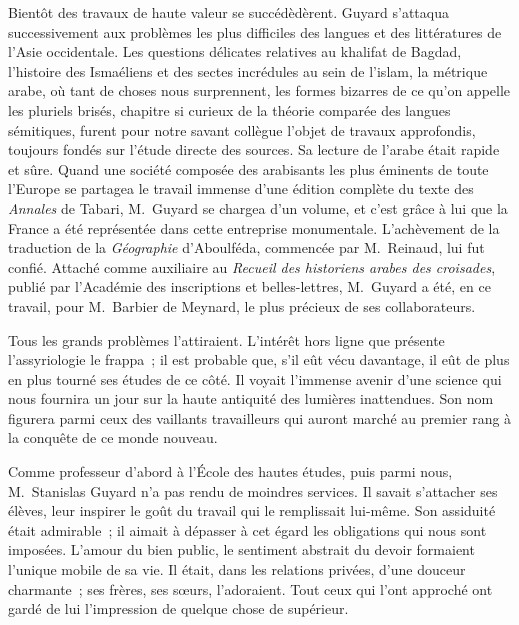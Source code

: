 \documentclass[french,twoside]{book} %
\newcommand\orgName[1]{#1}
\newcommand\persName[1]{#1}
\newcommand\placeName[1]{#1}
\begin{document}
Bientôt des travaux de haute valeur se succédèdèrent. {\persName Guyard} s’attaqua successivement aux problèmes les plus difficiles des langues et des littératures de l’{\placeName Asie occidentale}. Les questions délicates relatives au khalifat de {\placeName Bagdad}, l’histoire des {\orgName Ismaéliens} et des sectes incrédules au sein de l’islam, la métrique arabe, où tant de choses nous surprennent, les formes bizarres de ce qu’on appelle les pluriels brisés, chapitre si curieux de la théorie comparée des langues sémitiques, furent pour notre savant collègue l’objet de travaux approfondis, toujours fondés sur l’étude directe des sources. Sa lecture de l’arabe était rapide et sûre. Quand une société composée des arabisants les plus éminents de toute l’{\placeName Europe} se partagea le travail immense d’une édition complète du texte des \emph{Annales} de {\persName Tabari}, {\persName M. Guyard} se chargea d’un volume, et c’est grâce à lui que la {\orgName France} a été représentée dans cette entreprise monumentale. L’achèvement de la traduction de la \emph{Géographie} d’{\persName Aboulféda}, commencée par {\persName M. Reinaud}, lui fut confié. Attaché comme auxiliaire au \emph{Recueil des historiens arabes des croisades}, publié par l’{\orgName Académie des inscriptions et belles-lettres}, {\persName M. Guyard} a été, en ce travail, pour {\persName M. Barbier de Meynard}, le plus précieux de ses collaborateurs.\par
Tous les grands problèmes l’attiraient. L’intérêt hors ligne que présente l’assyriologie le frappa ; il est probable que, s’il eût vécu davantage, il eût de plus en plus tourné ses études de ce côté. Il voyait l’immense avenir d’une science qui nous fournira un jour sur la haute antiquité des lumières inattendues. Son nom figurera parmi ceux des vaillants travailleurs qui auront marché au premier rang à la conquête de ce monde nouveau.\par
Comme professeur d’abord à l’{\orgName École des hautes études}, puis parmi nous, {\persName M. Stanislas Guyard} n’a pas rendu de moindres services. Il savait s’attacher ses élèves, leur inspirer le goût du travail qui le remplissait lui-même. Son assiduité était admirable ; il aimait à dépasser à cet égard les obligations qui nous sont imposées. L’amour du bien public, le sentiment abstrait du devoir formaient l’unique mobile de sa vie. Il était, dans les relations privées, d’une douceur charmante ; ses frères, ses sœurs, l’adoraient. Tout ceux qui l’ont approché ont gardé de lui l’impression de quelque chose de supérieur.\par
\end{document}
